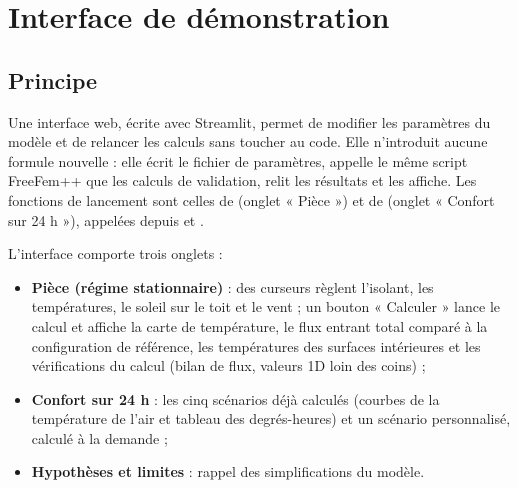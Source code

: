 \section{Interface de démonstration}\label{sec:interface}

\subsection{Principe}
Une interface web, écrite avec Streamlit, permet de modifier les paramètres du modèle et de relancer les
calculs sans toucher au code. Elle n'introduit aucune formule nouvelle : elle écrit le fichier de paramètres,
appelle le même script FreeFem++ que les calculs de validation, relit les résultats et les affiche. Les
fonctions de lancement sont celles de  (onglet « Pièce ») et de 
(onglet « Confort sur 24 h »), appelées depuis  et .

L'interface comporte trois onglets :
\begin{itemize}
	\item \textbf{Pièce (régime stationnaire)} : des curseurs règlent l'isolant, les températures, le soleil sur
	le toit et le vent ; un bouton « Calculer » lance le calcul et affiche la carte de température, le flux
	entrant total comparé à la configuration de référence, les températures des surfaces intérieures et les
	vérifications du calcul (bilan de flux, valeurs 1D loin des coins) ;
	\item \textbf{Confort sur 24 h} : les cinq scénarios déjà calculés (courbes de la température de l'air et
	tableau des degrés-heures) et un scénario personnalisé, calculé à la demande ;
	\item \textbf{Hypothèses et limites} : rappel des simplifications du modèle.
\end{itemize}

